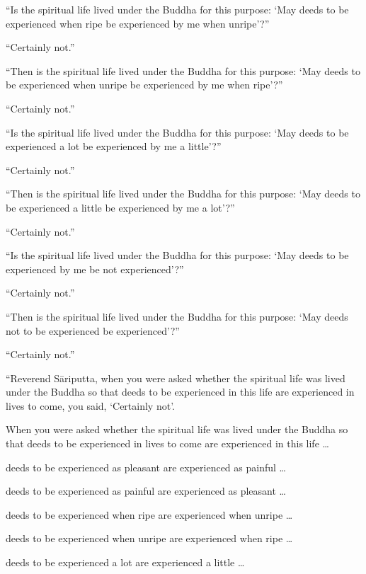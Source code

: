 \documentclass[12pt,openany]{book}%
\begin{document}
“Is the spiritual life lived under the Buddha for this purpose: ‘May deeds to be experienced when ripe be experienced by me when unripe’?” 

“Certainly not.” 

“Then is the spiritual life lived under the Buddha for this purpose: ‘May deeds to be experienced when unripe be experienced by me when ripe’?” 

“Certainly not.” 

“Is the spiritual life lived under the Buddha for this purpose: ‘May deeds to be experienced a lot be experienced by me a little’?” 

“Certainly not.” 

“Then is the spiritual life lived under the Buddha for this purpose: ‘May deeds to be experienced a little be experienced by me a lot’?” 

“Certainly not.” 

“Is the spiritual life lived under the Buddha for this purpose: ‘May deeds to be experienced by me be not experienced’?” 

“Certainly not.” 

“Then is the spiritual life lived under the Buddha for this purpose: ‘May deeds not to be experienced be experienced’?” 

“Certainly not.” 

“Reverend \textsanskrit{Sāriputta}, when you were asked whether the spiritual life was lived under the Buddha so that deeds to be experienced in this life are experienced in lives to come, you said, ‘Certainly not’. 

When you were asked whether the spiritual life was lived under the Buddha so that deeds to be experienced in lives to come are experienced in this life … 

deeds to be experienced as pleasant are experienced as painful … 

deeds to be experienced as painful are experienced as pleasant … 

deeds to be experienced when ripe are experienced when unripe … 

deeds to be experienced when unripe are experienced when ripe … 

deeds to be experienced a lot are experienced a little … 
\end{document}
